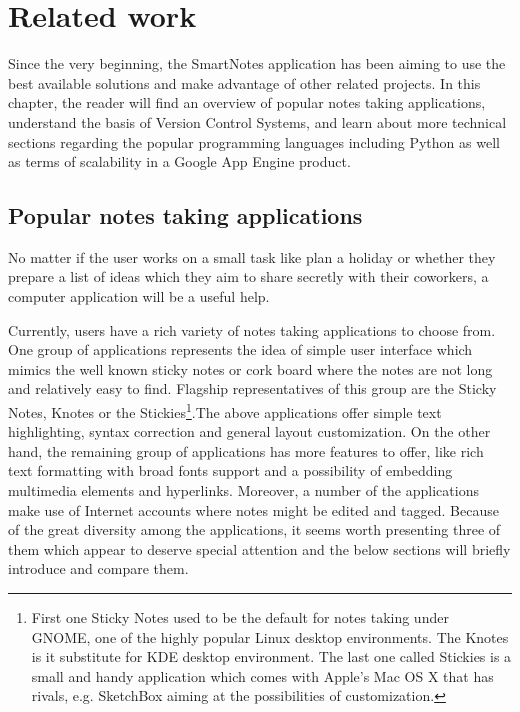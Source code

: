 \chapter{Related work}\label{sec:related_work}
Since the very beginning, the SmartNotes application has been aiming to use the best available solutions and make advantage of other related projects. In this chapter, the reader will find an overview of popular notes taking applications, understand the basis of Version Control Systems, and learn about more technical sections regarding the popular programming languages including Python  as well as terms of scalability in a Google App Engine product.

\section{Popular notes taking applications}\label{sec:popular_apps} 
No matter if the user works on a small task like plan a holiday or whether they prepare a list of ideas which they aim to share secretly with their coworkers, a computer application will be a useful help.     

Currently, users have a rich variety of notes taking applications to choose from. One group of applications represents the idea of simple user interface which mimics the well known sticky notes or cork board where the notes are not long and relatively easy to find. Flagship representatives of this group are the Sticky Notes, Knotes  or the Stickies\footnote{First one Sticky Notes used to be the default for notes taking under GNOME, one of the highly popular Linux desktop environments. The Knotes is it substitute for KDE  desktop environment.  The last one called Stickies is a small and handy application which comes with Apple's Mac OS X that has rivals, e.g. SketchBox aiming at the possibilities of customization.}.The above applications offer simple text highlighting, syntax correction and general layout customization. On the other hand, the remaining group of applications has more features to offer, like rich text formatting with broad fonts support and a possibility of embedding multimedia elements and hyperlinks. Moreover, a number of the applications make use of Internet accounts where notes might be edited and tagged. Because of the great diversity among the applications, it seems worth presenting three of them which appear to deserve special attention and the below sections will briefly introduce and compare them.

